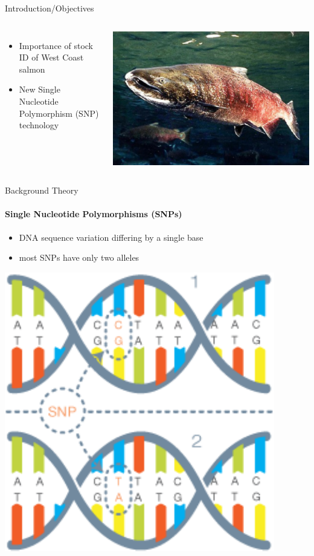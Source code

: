 \documentclass[letter,graphicx]{beamer}
\begin{document}
\begin{frame}{Introduction/Objectives}
\begin{columns}[T]
  \column{2.25in}
   \begin{itemize}
	\item Importance of stock ID of West Coast salmon
		\vspace{2mm}
	\item New Single Nucleotide Polymorphism (SNP) technology
   \end{itemize}
   \vspace{2mm}
   \centering  \includegraphics[width=.75\textwidth]{images/salmon_individual}
   
   \end{columns}
\end{frame}

\begin{frame}{Background Theory}
\framesubtitle{Single Nucleotide Polymorphisms (SNPs)}
\begin{itemize}
\item DNA sequence variation differing by a single base
\vspace{2mm}
\item most SNPs have only two alleles 
\end{itemize}
\begin{center}
\includegraphics[width=.5\textwidth]{images/snp_diagram}
\end{center}
\end{frame}
\end{document}
